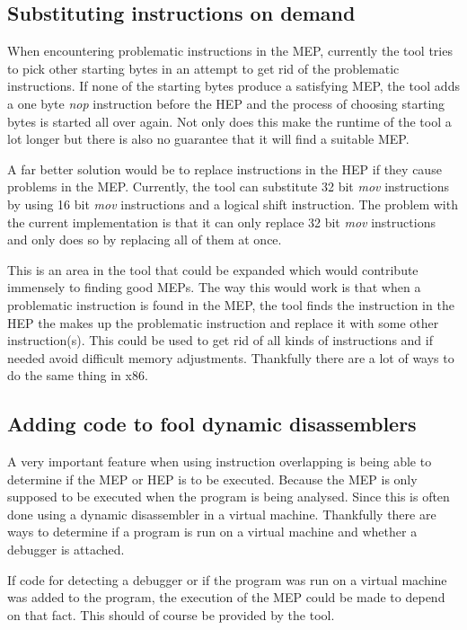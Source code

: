 \documentclass[11pt,twoside]{eitExjobb}
\begin{document}
\subsection{Substituting instructions on demand}
When encountering problematic instructions in the MEP, currently the tool tries to pick other starting bytes in an attempt to get rid of the problematic instructions. If none of the starting bytes produce a satisfying MEP, the tool adds a one byte \emph{nop} instruction before the HEP and the process of choosing starting bytes is started all over again. Not only does this make the runtime of the tool a lot longer but there is also no guarantee that it will find a suitable MEP.

A far better solution would be to replace instructions in the HEP if they cause problems in the MEP. Currently, the tool can substitute 32 bit \emph{mov} instructions by using 16 bit \emph{mov} instructions and a logical shift instruction. The problem with the current implementation is that it can only replace 32 bit \emph{mov} instructions and only does so by replacing all of them at once.

This is an area in the tool that could be expanded which would contribute immensely to finding good MEPs. The way this would work is that when a problematic instruction is found in the MEP, the tool finds the instruction in the HEP the makes up the problematic instruction and replace it with some other instruction(s). This could be used to get rid of all kinds of instructions and if needed avoid difficult memory adjustments. Thankfully there are a lot of ways to do the same thing in x86. 

\subsection{Adding code to fool dynamic disassemblers}
A very important feature when using instruction overlapping is being able to determine if the MEP or HEP is to be executed. Because the MEP is only supposed to be executed when the program is being analysed. Since this is often done using a dynamic disassembler in a virtual machine. Thankfully there are ways to determine if a program is run on a virtual machine and whether a debugger is attached.

If code for detecting a debugger or if the program was run on a virtual machine was added to the program, the execution of the MEP could be made to depend on that fact. This should of course be provided by the tool.
\end{document}
